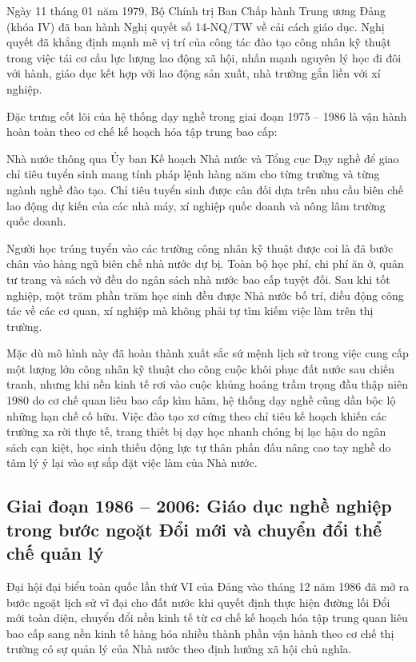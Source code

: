 Ngày 11 tháng 01 năm 1979, Bộ Chính trị Ban Chấp hành Trung ương Đảng (khóa IV) đã ban hành Nghị quyết số 14-NQ/TW về cải cách giáo dục. Nghị quyết đã khẳng định mạnh mẽ vị trí của công tác đào tạo công nhân kỹ thuật trong việc tái cơ cấu lực lượng lao động xã hội, nhấn mạnh nguyên lý học đi đôi với hành, giáo dục kết hợp với lao động sản xuất, nhà trường gắn liền với xí nghiệp.

Đặc trưng cốt lõi của hệ thống dạy nghề trong giai đoạn 1975 -- 1986 là vận hành hoàn toàn theo cơ chế kế hoạch hóa tập trung bao cấp:

Nhà nước thông qua Ủy ban Kế hoạch Nhà nước và Tổng cục Dạy nghề để giao chỉ tiêu tuyển sinh mang tính pháp lệnh hàng năm cho từng trường và từng ngành nghề đào tạo. Chỉ tiêu tuyển sinh được cân đối dựa trên nhu cầu biên chế lao động dự kiến của các nhà máy, xí nghiệp quốc doanh và nông lâm trường quốc doanh.

Người học trúng tuyển vào các trường công nhân kỹ thuật được coi là đã bước chân vào hàng ngũ biên chế nhà nước dự bị. Toàn bộ học phí, chi phí ăn ở, quân tư trang và sách vở đều do ngân sách nhà nước bao cấp tuyệt đối. Sau khi tốt nghiệp, một trăm phần trăm học sinh đều được Nhà nước bố trí, điều động công tác về các cơ quan, xí nghiệp mà không phải tự tìm kiếm việc làm trên thị trường.

Mặc dù mô hình này đã hoàn thành xuất sắc sứ mệnh lịch sử trong việc cung cấp một lượng lớn công nhân kỹ thuật cho công cuộc khôi phục đất nước sau chiến tranh, nhưng khi nền kinh tế rơi vào cuộc khủng hoảng trầm trọng đầu thập niên 1980 do cơ chế quan liêu bao cấp kìm hãm, hệ thống dạy nghề cũng dần bộc lộ những hạn chế cố hữu. Việc đào tạo xơ cứng theo chỉ tiêu kế hoạch khiến các trường xa rời thực tế, trang thiết bị dạy học nhanh chóng bị lạc hậu do ngân sách cạn kiệt, học sinh thiếu động lực tự thân phấn đấu nâng cao tay nghề do tâm lý ỷ lại vào sự sắp đặt việc làm của Nhà nước.

\subsection{Giai đoạn 1986 -- 2006: Giáo dục nghề nghiệp trong bước ngoặt Đổi mới và chuyển đổi thể chế quản lý}

Đại hội đại biểu toàn quốc lần thứ VI của Đảng vào tháng 12 năm 1986 đã mở ra bước ngoặt lịch sử vĩ đại cho đất nước khi quyết định thực hiện đường lối Đổi mới toàn diện, chuyển đổi nền kinh tế từ cơ chế kế hoạch hóa tập trung quan liêu bao cấp sang nền kinh tế hàng hóa nhiều thành phần vận hành theo cơ chế thị trường có sự quản lý của Nhà nước theo định hướng xã hội chủ nghĩa.

